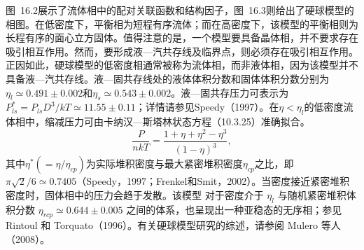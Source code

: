 图~16.2展示了流体相中的配对关联函数和结构因子，图~16.3则给出了硬球模型的相图。在低密度下，平衡相为短程有序流体；而在高密度下，该模型的平衡相则为长程有序的面心立方固体。值得注意的是，一个模型要具备晶体相，并不要求存在吸引相互作用。然而，要形成液---汽共存线及临界点，则必须存在吸引相互作用。正因如此，硬球模型的低密度相通常被称为流体相，而非液体相，因为该模型并不具备液---汽共存线。液---固共存线处的液体体积分数和固体体积分数分别为\(\eta_{l} \simeq 0.491 \pm 0.002\)和\(\eta_{s} \simeq 0.543 \pm 0.002\)。液---固共存压力可表示为\(P_{ls}^{*} = P_{ls}D^{3}/kT \simeq 11.55 \pm 0.11\)；详情请参见Speedy（1997）。在\(\eta < \eta_{l}\)的低密度流体相中，缩减压力可由卡纳汉---斯塔林状态方程（10.3.25）准确拟合。
\begin{equation}\tag{16.4.6}\label{eq:16.4.6}
\frac { P } { n k T } = \frac { 1 + \eta + \eta ^{2} - \eta ^{3} } { ( 1 - \eta ) ^{3} } ,
\end{equation}
其中\(\eta^{*}(= \eta/\eta_{cp})\)为实际堆积密度与最大紧密堆积密度\(\eta_{cp}\)之比，即\(\pi\sqrt{2}/6\simeq0.7405\)（Speedy，1997；Frenkel和Smit，2002）。当密度接近紧密堆积密度时，固体相中的压力会趋于发散。该模型
对于密度介于 \(\eta_{l}\) 与随机紧密堆积体积分数 \(\eta_{rcp} \simeq 0.644 \pm 0.005\) 之间的体系，也呈现出一种亚稳态的无序相；参见 Rintoul 和 Torquato（1996）。有关硬球模型研究的综述，请参阅 Mulero 等人（2008）。
